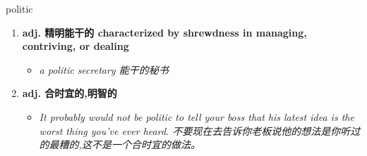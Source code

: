 
\begin{frame}
{\huge politic}
\begin{center}
\begin{enumerate}\Large
  \item \textbf{adj. 精明能干的 characterized by shrewdness in managing, contriving, or dealing}
  \begin{itemize}
    \item \em{\Large{a politic secretary 能干的秘书}}
  \end{itemize}
  \item \textbf{adj. 合时宜的,明智的}
  \begin{itemize}
    \item \em{\Large{It probably would not be politic to tell your boss that his latest idea is the worst thing you've ever heard. 不要现在去告诉你老板说他的想法是你听过的最糟的,这不是一个合时宜的做法。}}
  \end{itemize}
\end{enumerate}
\end{center}
\end{frame}
